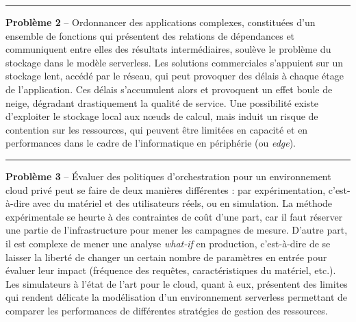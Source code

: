 
\begin{center}
    \rule{4cm}{0.4pt}
\end{center}

\textbf{Problème 2} -- Ordonnancer des applications complexes, constituées d'un ensemble de fonctions qui présentent des relations de dépendances et communiquent entre elles des résultats intermédiaires, soulève le problème du stockage dans le modèle serverless. Les solutions commerciales s'appuient sur un stockage lent, accédé par le réseau, qui peut provoquer des délais à chaque étage de l'application. Ces délais s'accumulent alors et provoquent un effet boule de neige, dégradant drastiquement la qualité de service. Une possibilité existe d'exploiter le stockage local aux nœuds de calcul, mais induit un risque de contention sur les ressources, qui peuvent être limitées en capacité et en performances dans le cadre de l'informatique en périphérie (ou \textit{edge}).


\begin{center}
    \rule{4cm}{0.4pt}
\end{center}

\textbf{Problème 3} -- Évaluer des politiques d'orchestration pour un environnement cloud privé peut se faire de deux manières différentes : par expérimentation, c'est-à-dire avec du matériel et des utilisateurs réels, ou en simulation. La méthode expérimentale se heurte à des contraintes de coût d'une part, car il faut réserver une partie de l'infrastructure pour mener les campagnes de mesure. D'autre part, il est complexe de mener une analyse \textit{what-if} en production, c'est-à-dire de se laisser la liberté de changer un certain nombre de paramètres en entrée pour évaluer leur impact (fréquence des requêtes, caractéristiques du matériel, etc.). Les simulateurs à l'état de l'art pour le cloud, quant à eux, présentent des limites qui rendent délicate la modélisation d'un environnement serverless permettant de comparer les performances de différentes stratégies de gestion des ressources.

